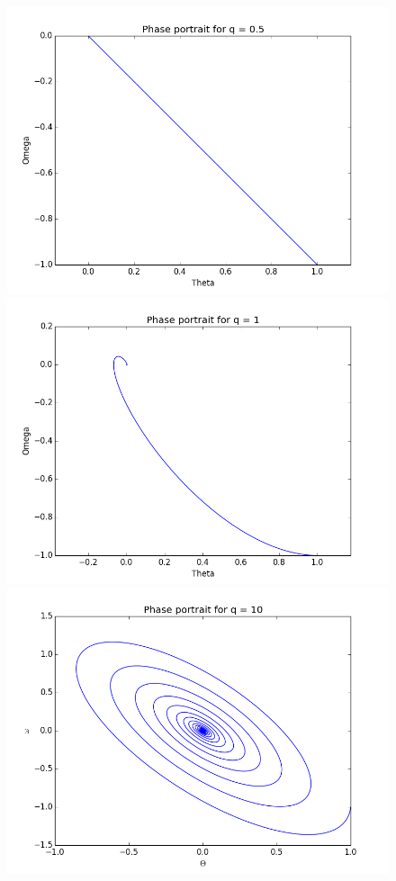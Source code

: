 \documentclass[12pt]{article}
\begin{document}
\begin{figure}
\centering
\begin{minipage}[t]{0.45\textwidth}
\includegraphics[width=\textwidth]{05.png}
\end{minipage}
\begin{minipage}[t]{0.45\textwidth}
\includegraphics[width=\textwidth]{1.png}
\end{minipage}
\begin{minipage}[t]{0.45\textwidth}
\includegraphics[width=\textwidth]{10.png}

\end{minipage}
\end{figure}
\end{document}
